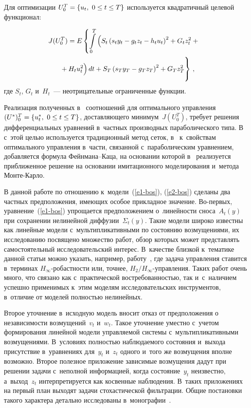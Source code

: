 \begin{multicols}{2}
Для 
оптимизации $U_0^{{T}}\hm= \{u_t, \ 0\hm\leq t\hm\leq T\}$ используется 
квадратичный целевой функционал:

\noindent
     \begin{multline}
     \hspace*{-5pt}J(U_0^{{T}})=E\left\{ 
     \int\limits_0^{{T}}\left( S_t\left( s_t y_t-g_t z_t -h_t u_t\right)^2 +G_t z_t^2+ {}\right.\right.\\
\left.\left.     {}+
H_t u_t^2
\vphantom{\left( \right)^2}
\right)dt + S_T\left( s_T y_T-g_T z_T\right)^2 +G_T z_T^2
\vphantom{\int\limits_0^{{T}}}
\right\}\,,
     \label{e3-bos}
     \end{multline}
где $S_t$, $G_t$ и~$H_t$~--- неотрицательные ограниченные функции.

\pagebreak

     Реализация полученных в~\cite{1-bos} соотношений для оптимального 
управления $(U^*)_0^{{T}}\hm= \{u_t^*,\ 0\hm\leq t\hm\leq T\}$, доставляющего 
минимум~$J(U_0^{{T}})$, требует решения дифференциальных уравнений 
в~частных производных параболического типа. В~\cite{2-bos} с~этой \mbox{целью} 
используется традиционный метод сеток, в~\cite{3-bos} к~свойствам 
оптимального управления в~части, связанной с~параболическим уравнением, 
добавляется формула Фейн\-ма\-на--Ка\-ца, на основании которой  
в~\cite{4-bos} реализуется приближенное решение на основании 
имитационного моделирования и~метода Мон\-те-Карло.
     
     В данной работе по отношению к~модели~(\ref{e1-bos}), (\ref{e2-bos}) 
сделаны два частных предположения, име\-ющих особое прикладное значение. 
Во-пер\-вых, уравнение~(\ref{e1-bos}) упрощается предположением 
о~линейности сноса~$A_t(y)$ при сохранении нелинейной 
диффузии~$\Sigma_t(y)$. Такие модели широко известны как линейные 
модели с~мультипликативными по состоянию возмущениями, их 
исследованию посвящено множество работ, обзор которых может 
представлять самостоятельный исследовательский интерес. В~качестве 
близкой к~тематике данной статьи можно указать, например,  
работу~\cite{6-bos}, где задача управления ставится в~терминах  
$H_\infty$-ро\-баст\-ности или, точнее, $H_2/H_\infty$-управ\-ле\-ния. Таких 
работ очень много, что связано как с~практической востребованностью, так 
и~с~наличием успешно применимых к~этим моделям исследовательских 
инструментов, в~отличие от моделей полностью нелинейных.

     
     Второе уточнение в~исходную модель вносит отказ от предположения о 
независимости возмущений~$v_t$ и~$w_t$. Такое уточнение уместно  
 с~учетом формирования линейной модели управляемой системы 
с~мультипликативными возмущениями. В~условиях полностью 
наблюдаемого состояния и~выхода присутствие в~уравнениях для~$y_t$ 
и~$z_t$ одного и~того же возмущения вполне возможно. Второе полезное 
приложение зависимые возмущения дадут при решении задачи с~неполной 
информацией, когда состояние~$y_t$ неизвестно, а~выход~$z_t$ 
интерпретируется как косвенные наблюдения. В~таких приложениях на 
первый план выходят задачи стохастической фильтрации. Общие постановки 
такого характера детально исследованы в~монографии~\cite{7-bos}.


\end{multicols}
